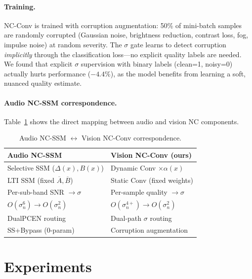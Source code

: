 \documentclass{bmvc2k}
\begin{document}
\paragraph{Training.}
NC-Conv is trained with corruption augmentation: 50\% of mini-batch samples are randomly corrupted (Gaussian noise, brightness reduction, contrast loss, fog, impulse noise) at random severity.
The $\sigma$ gate learns to detect corruption \emph{implicitly} through the classification loss---no explicit quality labels are needed.
We found that explicit $\sigma$ supervision with binary labels (clean=1, noisy=0) actually hurts performance ($-4.4\%$), as the model benefits from learning a soft, nuanced quality estimate.

\paragraph{Audio NC-SSM correspondence.}
Table~\ref{tab:mapping} shows the direct mapping between audio and vision NC components.

\begin{table}[t]
\centering
\caption{Audio NC-SSM $\leftrightarrow$ Vision NC-Conv correspondence.}
\label{tab:mapping}
\small
\begin{tabular}{@{}ll@{}}
\toprule
\textbf{Audio NC-SSM}~\cite{choi2026ncssm} & \textbf{Vision NC-Conv (ours)} \\
\midrule
Selective SSM ($\Delta(x), B(x)$) & Dynamic Conv $\times \alpha(x)$ \\
LTI SSM (fixed $\overline{A}, \overline{B}$) & Static Conv (fixed weights) \\
Per-sub-band SNR $\to \sigma$ & Per-sample quality $\to \sigma$ \\
$O(\sigma_n^6) \to O(\sigma_n^2)$ & $O(\sigma_n^{4+}) \to O(\sigma_n^2)$ \\
DualPCEN routing & Dual-path $\sigma$ routing \\
SS+Bypass (0-param) & Corruption augmentation \\
\bottomrule
\end{tabular}
\end{table}


\section{Experiments}
\label{sec:experiments}
\end{document}
